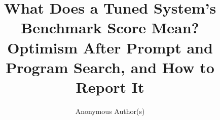 \documentclass{article}
\title{What Does a Tuned System's Benchmark Score Mean?\\Optimism After Prompt and Program Search, and How to Report It}
\author{Anonymous Author(s)}
\begin{document}
\maketitle

\begin{abstract}

\end{abstract}










\appendix


\end{document}
